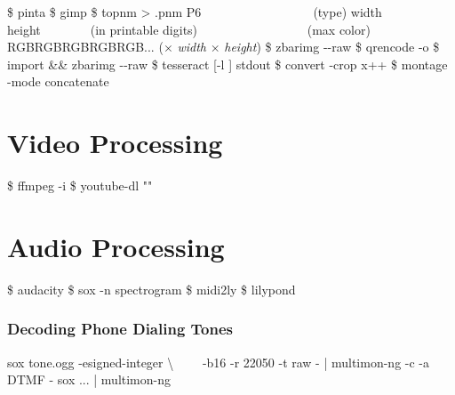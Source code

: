 \documentclass{refcard}
\begin{document}
\begin{ldesc}
	   \$ pinta 
	 \$ gimp 
	    \$ topnm  > .pnm
	 P6~~~~~~~~~~~~~~~~~~\textnormal{(type)}\li
	                      width height~~~~~~~~\textnormal{(in printable digits)} ~~~~~~~~~~~~~~~~~\textnormal{(max color)} \li
					      RGBRGBRGBRGBRGB...  \textnormal{($\times$ \textit{width} $\times$ \textit{height})}
	   \$ zbarimg -{-}raw 
	 \$ qrencode  -o 
	 \$ import  \&\& zbarimg -{-}raw 
	 \$ tesseract [-l ]  stdout
	\li[Crop]                 \$ convert -crop x++  
	       \$ montage -mode concatenate  
\end{ldesc}


\section{Video Processing}

\begin{ldesc}
	  \$ ffmpeg -i  
	 \$ youtube-dl ""
\end{ldesc}


\section{Audio Processing}

\begin{ldesc}
	   \$ audacity 
	\li[Spectrogram]                   \$ sox  -n spectrogram
	       \$ midi2ly 
	          \$ lilypond 
\end{ldesc}

\subsubsection{Decoding Phone Dialing Tones}

\begin{ldesc}
	   sox tone.ogg -esigned-integer \textbackslash \li
	                   ~~~~-b16 -r 22050 -t raw - | \li
	                   multimon-ng -c -a DTMF -
	 sox ... | multimon-ng
\end{ldesc}
\end{document}
